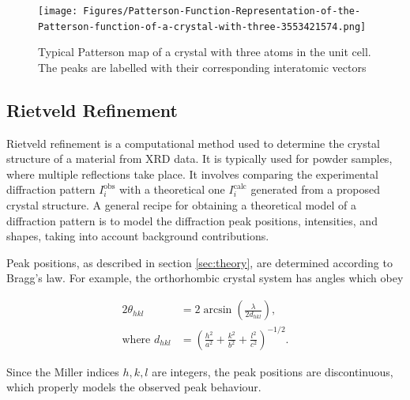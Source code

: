 \documentclass[aps,prb,twocolumn,superscriptaddress]{revtex4-2}
\begin{document}
\begin{figure}[h]
    \centering
    \texttt{[image: Figures/Patterson-Function-Representation-of-the-Patterson-function-of-a-crystal-with-three-3553421574.png]}
    \caption{Typical Patterson map of a crystal with three atoms in the unit cell.
        The peaks are labelled with their corresponding interatomic vectors 
    }
    \label{fig:Patterson}
\end{figure}

\subsection{Rietveld Refinement}
Rietveld refinement is a computational method used to determine the crystal
structure of a material from XRD data. It is typically used for powder samples,
where multiple reflections take place. It involves comparing the experimental
diffraction pattern $I_i^{\text{obs}}$ with a theoretical one $I_i^{\text{calc}}$
generated from a proposed crystal structure. A general recipe for obtaining a 
theoretical model of a diffraction pattern is to model the diffraction peak 
positions, intensities, and shapes, taking into account background contributions.

Peak positions, as described in section \ref{sec:theory}, are determined according 
to Bragg's law. For example, the orthorhombic crystal system has angles which obey 

\begin{equation}
    \begin{split}
        2\theta_{hkl} &= 2\arcsin\left(\frac{\lambda}{2d_{hkl}}\right), \\
        \text{where } d_{hkl} &= \left(\frac{h^2}{a^2} + \frac{k^2}{b^2} + \frac{l^2}{c^2}\right)^{-1/2}.
    \end{split}
\end{equation}

Since the Miller indices $h, k, l$ are integers, the peak positions are discontinuous,
which properly models the observed peak behaviour.
\end{document}
